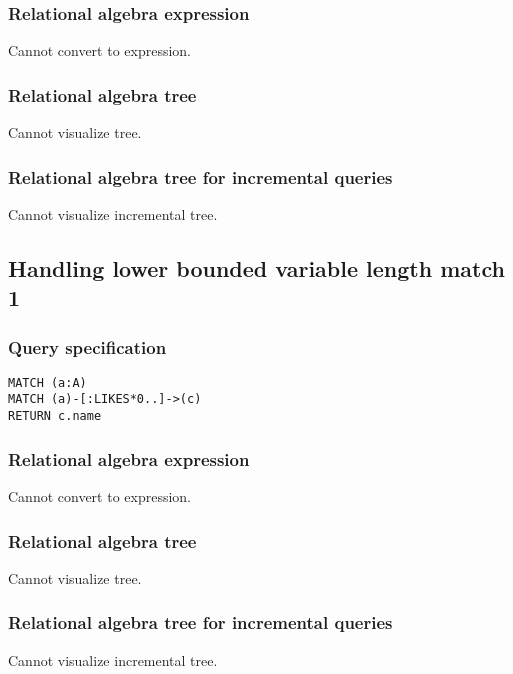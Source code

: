 \subsubsection*{Relational algebra expression}

Cannot convert to expression.

\subsubsection*{Relational algebra tree}

Cannot visualize tree.

\subsubsection*{Relational algebra tree for incremental queries}

Cannot visualize incremental tree.

\subsection{Handling lower bounded variable length match 1}

\subsubsection*{Query specification}

\begin{lstlisting}
MATCH (a:A)
MATCH (a)-[:LIKES*0..]->(c)
RETURN c.name
\end{lstlisting}

\subsubsection*{Relational algebra expression}

Cannot convert to expression.

\subsubsection*{Relational algebra tree}

Cannot visualize tree.

\subsubsection*{Relational algebra tree for incremental queries}

Cannot visualize incremental tree.

